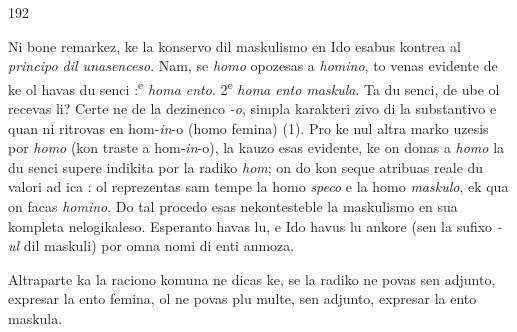 \begin{VUpage}[196]{192}

Ni bone remarkez, ke la konservo dil maskulismo en Ido\nl
esabus kontrea al \textit{principo dil unasenceso}. Nam, se \textit{homo}\nl
opozesas a \textit{homino}, to venas evidente de ke ol havas du senci :\textsuperscript{e} \textit{homa ento}. 2\textsuperscript{e} \textit{homa ento maskula}. Ta du senci, de ube\nl
ol recevas li? Certe ne de la dezinenco \textit{-o}, simpla karakteri\cc
zivo di la substantivo e quan ni ritrovas en hom-\textit{in}-o (homo\nl
femina) (1). Pro ke nul altra marko uzesis por \textit{homo} (kon\cc
traste a hom-\textit{in}-o), la kauzo esas evidente, ke on donas a \textit{homo}\nl
la du senci supere indikita por la radiko \textit{hom}; on do kon\cc
seque atribuas reale du valori ad ica : ol reprezentas sam\cc
tempe la homo \textit{speco} e la homo \textit{maskulo}, ek qua on facas\nl
\textit{homino}. Do tal procedo esas nekontesteble la maskulismo en\nl
sua kompleta nelogikaleso. Esperanto havas lu, e Ido havus lu\nl
ankore (sen la sufixo \textit{-ul} dil maskuli) por omna nomi di\nl
enti anmoza.

Altraparte ka la raciono komuna ne dicas ke, se la radiko\nl
ne povas sen adjunto, expresar la ento femina, ol ne povas\nl
plu multe, sen adjunto, expresar la ento maskula.


\end{VUpage}
